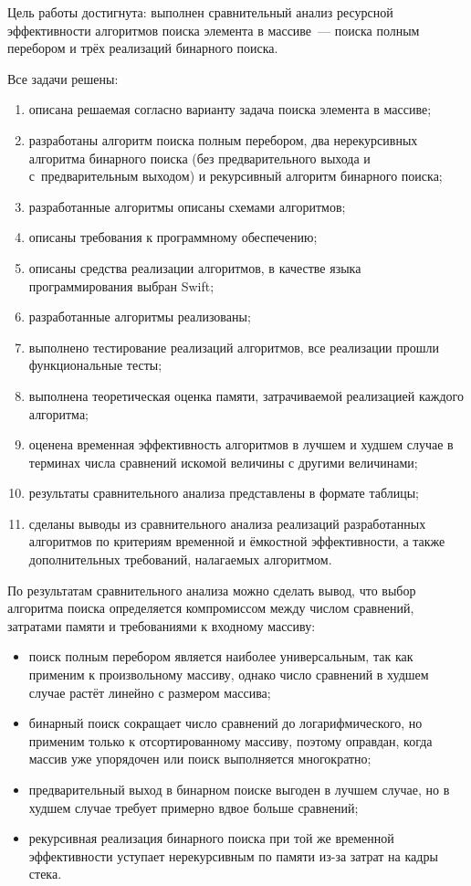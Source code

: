 
Цель работы достигнута: выполнен сравнительный анализ ресурсной эффективности
алгоритмов поиска элемента в массиве~--- поиска полным перебором и трёх
реализаций бинарного поиска.

Все задачи решены:
\begin{enumerate}
	\item описана решаемая согласно варианту задача поиска элемента в массиве;
	\item разработаны алгоритм поиска полным перебором, два нерекурсивных
	алгоритма бинарного поиска (без предварительного выхода и с~предварительным
	выходом) и рекурсивный алгоритм бинарного поиска;
	\item разработанные алгоритмы описаны схемами алгоритмов;
	\item описаны требования к программному обеспечению;
	\item описаны средства реализации алгоритмов, в качестве языка
	программирования выбран Swift;
	\item разработанные алгоритмы реализованы;
	\item выполнено тестирование реализаций алгоритмов, все реализации прошли
	функциональные тесты;
	\item выполнена теоретическая оценка памяти, затрачиваемой реализацией
	каждого алгоритма;
	\item оценена временная эффективность алгоритмов в лучшем и худшем случае
	в терминах числа сравнений искомой величины с другими величинами;
	\item результаты сравнительного анализа представлены в формате таблицы;
	\item сделаны выводы из сравнительного анализа реализаций разработанных
	алгоритмов по критериям временной и ёмкостной эффективности, а также
	дополнительных требований, налагаемых алгоритмом.
\end{enumerate}

По результатам сравнительного анализа можно сделать вывод, что выбор алгоритма
поиска определяется компромиссом между числом сравнений, затратами памяти
и требованиями к входному массиву:
\begin{itemize}
	\item поиск полным перебором является наиболее универсальным, так как
	применим к произвольному массиву, однако число сравнений в худшем случае
	растёт линейно с размером массива;
	\item бинарный поиск сокращает число сравнений до логарифмического, но
	применим только к отсортированному массиву, поэтому оправдан, когда массив
	уже упорядочен или поиск выполняется многократно;
	\item предварительный выход в бинарном поиске выгоден в лучшем случае, но
	в худшем случае требует примерно вдвое больше сравнений;
	\item рекурсивная реализация бинарного поиска при той же временной
	эффективности уступает нерекурсивным по памяти из-за затрат на кадры стека.
\end{itemize}